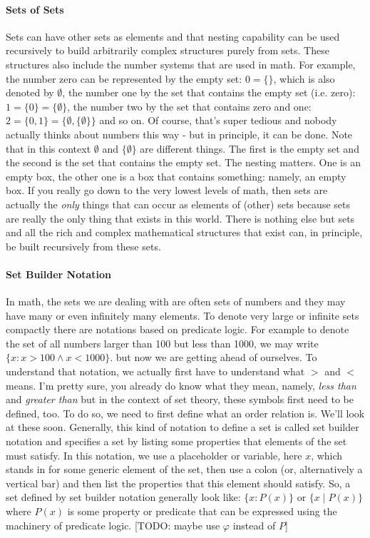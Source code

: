 \paragraph{Sets of Sets}
Sets can have other sets as elements and that nesting capability can be used recursively to build arbitrarily complex structures purely from sets. These structures also include the number systems that are used in math. For example, the number zero can be represented by the empty set: $0 = \{\}$, which is also denoted by $\emptyset$, the number one by the set that contains the empty set (i.e. zero): $1 = \{ 0 \} =  \{ \emptyset \}$, the number two by the set that contains zero and one: $2 = \{ 0, 1 \} = \{ \emptyset, \{ \emptyset \} \}$ and so on. Of course, that's super tedious and nobody actually thinks about numbers this way - but in principle, it can be done. Note that in this context $\emptyset$ and $\{ \emptyset \}$ are different things. The first is the empty set and the second is the set that contains the empty set. The nesting matters. One is an empty box, the other one is a box that contains something: namely, an empty box. If you really go down to the very lowest levels of math, then sets are actually the \emph{only} things that can occur as elements of (other) sets because sets are really the only thing that exists in this world. There is nothing else but sets and all the rich and complex mathematical structures that exist can, in principle, be built recursively from these sets. 

\paragraph{Set Builder Notation}
In math, the sets we are dealing with are often sets of numbers and they may have many or even infinitely many elements. To denote very large or infinite sets compactly there are notations based on predicate logic. For example to denote the set of all numbers larger than 100 but less than 1000, we may write $\{x : x > 100 \wedge x < 1000\}$. but now we are getting ahead of ourselves. To understand that notation, we actually first have to understand what $>$ and $<$ means. I'm pretty sure, you already do know what they mean, namely, \emph{less than} and \emph{greater than} but in the context of set theory, these symbols first need to be defined, too. To do so, we need to first define what an order relation is. We'll look at these soon. Generally, this kind of notation to define a set is called set builder notation and specifies a set by listing some properties that elements of the set must satisfy. In this notation, we use a placeholder or variable, here $x$, which stands in for some generic element of the set, then use a colon (or, alternatively a vertical bar) and then list the properties that this element should satisfy. So, a set defined by set builder notation generally look like: $\{x : P(x)\}$ or  $\{x \; | \; P(x)\}$ where $P(x)$ is some property or predicate that can be expressed using the machinery of predicate logic. [TODO: maybe use $\varphi$ instead of $P$]

